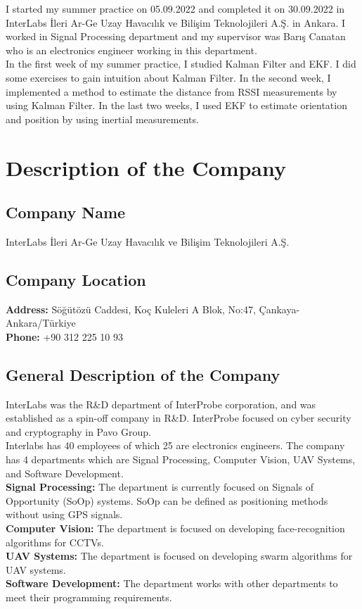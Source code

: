 \documentclass[12pt]{article}
\begin{document}
    I started my summer practice on 05.09.2022 and completed it on 
    30.09.2022 in InterLabs İleri Ar-Ge Uzay Havacılık ve 
    Bilişim Teknolojileri A.Ş. in Ankara. I worked in Signal Processing 
    department and my supervisor was Barış Canatan who is an electronics 
    engineer working in this department. \\
    In the first week of my summer practice, I studied Kalman Filter and EKF. 
    I did some exercises to gain intuition about Kalman Filter. 
    In the second week, I implemented a method to estimate the distance from 
    RSSI measurements by using Kalman Filter. In the last two weeks, I used EKF to 
    estimate orientation and position by using inertial measurements.

    \section{Description of the Company}

    \subsection{Company Name}
    InterLabs İleri Ar-Ge Uzay Havacılık ve Bilişim Teknolojileri A.Ş.

    \subsection{Company Location}
    \textbf{Address:} Söğütözü Caddesi, Koç Kuleleri A Blok, No:47, 
    Çankaya-Ankara/Türkiye\\
    \textbf{Phone:} +90 312 225 10 93

    \subsection{General Description of the Company}
    InterLabs was the R\&D department of InterProbe corporation, and was established 
    as a spin-off company in R\&D. InterProbe focused on cyber security and cryptography 
    in Pavo Group. \\
    Interlabs has 40 employees of which 25 are electronics engineers. The company has 4 
    departments which are Signal Processing, Computer Vision, UAV Systems, and 
    Software Development. \\
    \textbf{Signal Processing:} The department is currently focused on 
    Signals of Opportunity (SoOp) systems. SoOp can be defined as positioning 
    methods without using GPS signals.\\
    \textbf{Computer Vision:} The department is focused on developing 
    face-recognition algorithms for CCTVs.\\
    \textbf{UAV Systems:} The department is focused on developing swarm 
    algorithms for UAV systems.\\
    \textbf{Software Development:} The department works with other departments 
    to meet their programming requirements. 
\end{document}
